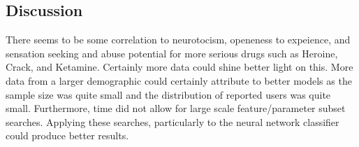 \documentclass[12pt]{article}
\begin{document}
\begin{flushleft}
		\section{Discussion}
		There seems to be some correlation to neurotocism, openeness to expeience, and sensation seeking and abuse potential for more serious drugs such as Heroine, Crack, and Ketamine. Certainly more data could shine better light on this. More data from a larger demographic could certainly attribute to better models as the sample size was quite small and the distribution of reported users was quite small. Furthermore, time did not allow for large scale feature/parameter subset searches. Applying these searches, particularly to the neural network classifier could produce better results.\\
		
		
		
		
		
	\end{flushleft}
\end{document}
